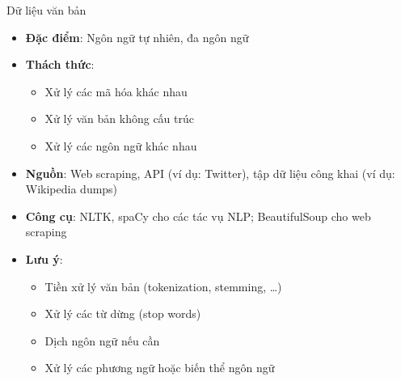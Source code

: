 \documentclass{beamer}
\begin{document}
\begin{frame}{Dữ liệu văn bản}
    \begin{itemize}
        \item \textbf{Đặc điểm}: Ngôn ngữ tự nhiên, đa ngôn ngữ
        \item \textbf{Thách thức}:
        \begin{itemize}
            \item Xử lý các mã hóa khác nhau
            \item Xử lý văn bản không cấu trúc
            \item Xử lý các ngôn ngữ khác nhau %
        \end{itemize}
        \item \textbf{Nguồn}: Web scraping, API (ví dụ: Twitter), tập dữ liệu công khai (ví dụ: Wikipedia dumps)
        \item \textbf{Công cụ}: NLTK, spaCy cho các tác vụ NLP; BeautifulSoup cho web scraping
        \item \textbf{Lưu ý}:
        \begin{itemize}
            \item Tiền xử lý văn bản (tokenization, stemming, \dots)
            \item Xử lý các từ dừng (stop words)
            \item Dịch ngôn ngữ nếu cần
            \item Xử lý các phương ngữ hoặc biến thể ngôn ngữ
        \end{itemize}
    \end{itemize}
\end{frame}
\end{document}
